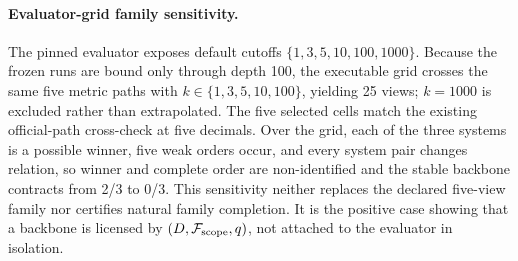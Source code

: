 \paragraph{Evaluator-grid family sensitivity.} The pinned evaluator exposes default cutoffs \(\{1,3,5,10,100,1000\}\).  Because the frozen runs are bound only through depth 100, the executable grid crosses the same five metric paths with \(k\in\{1,3,5,10,100\}\), yielding 25 views; \(k=1000\) is excluded rather than extrapolated.  The five selected cells match the existing official-path cross-check at five decimals.  Over the grid, each of the three systems is a possible winner, five weak orders occur, and every system pair changes relation, so winner and complete order are non-identified and the stable backbone contracts from 2/3 to 0/3.  This sensitivity neither replaces the declared five-view family nor certifies natural family completion.  It is the positive case showing that a backbone is licensed by \((D,\mathcal F_{\mathrm{scope}},q)\), not attached to the evaluator in isolation.
\endgroup
